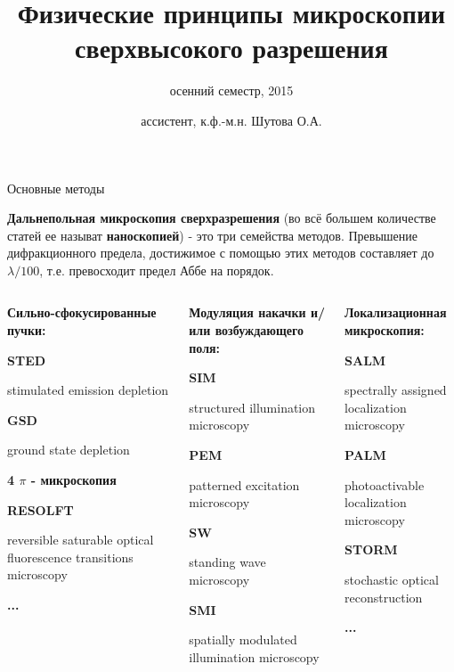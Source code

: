 \documentclass[9pt, compress, xcolor=table]{beamer}
\title{Физические принципы микроскопии сверхвысокого разрешения}
\subtitle{осенний семестр, 2015}
\author{ассистент, к.ф.-м.н. Шутова О.А.}
\institute{МГУ им. М.В. Ломоносова, физический факультет}
\begin{document}
\maketitle


\begin{frame}{Основные методы}

\textcolor{red!50!black}{\textbf{Дальнепольная микроскопия сверхразрешения}} (во всё большем количестве статей ее называт \textcolor{red!50!black}{\textbf{наноскопией}}) - это три семейства методов. Превышение дифракционного предела, достижимое с помощью этих методов составляет до \textcolor{red!50!black}{\textbf{$\lambda/100$}}, т.е. превосходит предел Аббе на порядок.
\begin{columns}[c]
\column{4cm}
\begin{center}
\textcolor{red!50!black}{\textbf{Сильно-сфокусированные пучки:}}

\textbf{STED} 

{\small stimulated emission depletion} 

\textbf{GSD} 

{\small ground state depletion}

\textbf{4 $\pi$ - микроскопия}

\textbf{RESOLFT}

{\small reversible saturable optical fluorescence transitions microscopy}

\textbf{...}
\end{center}
\column{4cm}
\begin{center}
\textcolor{red!50!black}{\textbf{Модуляция накачки и/или возбуждающего поля:}}

\textbf{SIM}  

{\small structured illumination microscopy}

\textbf{PEM}

{\small patterned excitation microscopy}

\textbf{SW}

{\small standing wave microscopy}

\textbf{SMI}  

{\small spatially modulated illumination microscopy}
\end{center}
\column{4cm}
\begin{center}
\textcolor{red!50!black}{\textbf{Локализационная микроскопия:}}

\textbf{SALM} 

{\small spectrally assigned localization microscopy}

\textbf{PALM}

{\small photoactivable localization microscopy}

\textbf{STORM}

{\small stochastic optical reconstruction}

\textbf{...}
\end{center}

\end{columns}

\end{frame}
\end{document}
